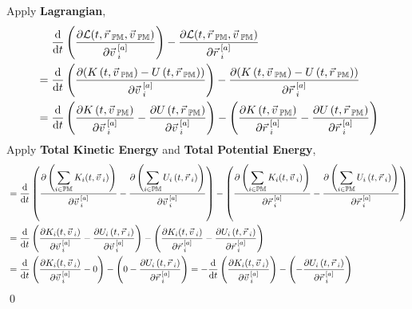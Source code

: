 \documentclass[12pt]{amsart}
\renewenvironment{proof}{{\bfseries Proof.}}{\qed}
\let\oldvec\vec
\renewcommand{\vec}[1]{\oldvec{#1}\hspace{0.1em}}
\begin{document}
\begin{proof}
Apply \textbf{Lagrangian},
\begin{align*}
& \quad \ \dfrac{\mathrm{d}}{\mathrm{d} t} \left ( \dfrac{\partial \mathcal{L} (t, \vec{r}_\mathbb{PM}, \vec{v}_\mathbb{PM})}{\partial \vec{v}^{[a]}_i}  \right ) - \dfrac{\partial \mathcal{L} (t, \vec{r}_\mathbb{PM}, \vec{v}_\mathbb{PM})}{\partial \vec{r}^{[a]}_i}\\
&= \dfrac{\mathrm{d}}{\mathrm{d} t} \left ( \dfrac{\partial (K\left ( t, \vec{v}_\mathbb{PM} \right ) - U\left ( t, \vec{r}_\mathbb{PM} \right ))}{\partial \vec{v}^{[a]}_i}  \right ) - \dfrac{\partial (K\left ( t, \vec{v}_\mathbb{PM} \right )-U\left ( t, \vec{r}_\mathbb{PM} \right ))}{\partial \vec{r}^{[a]}_i} \\
& = \dfrac{\mathrm{d}}{\mathrm{d} t} \left ( \dfrac{\partial K \left ( t, \vec{v}_\mathbb{PM} \right )}{\partial \vec{v}^{[a]}_i} - \dfrac{\partial U\left ( t, \vec{r}_\mathbb{PM} \right )}{\partial \vec{v}^{[a]}_i}  \right ) - \left ( \dfrac{\partial K\left ( t, \vec{v}_\mathbb{PM} \right )}{\partial \vec{r}^{[a]}_i} - \dfrac{\partial U\left ( t, \vec{r}_\mathbb{PM} \right )}{\partial \vec{r}^{[a]}_i} \right )
\end{align*}
Apply \textbf{Total Kinetic Energy} and \textbf{Total Potential Energy},
\begin{align*}
& = \dfrac{\mathrm{d}}{\mathrm{d} t} \left ( \dfrac{\partial \left (\displaystyle \sum_{i \in \mathbb{PM}} K_i (t, \vec{v}_i) \right )}{\partial \vec{v}^{[a]}_i} - \dfrac{\partial \left ( \displaystyle \sum_{i \in \mathbb{PM}} U_i \left ( t, \vec{r}_i \right )\right )}{\partial \vec{v}^{[a]}_i}  \right ) - \left ( \dfrac{\partial \left ( \displaystyle \sum_{i \in \mathbb{PM}} K_i (t, \vec{v}_i) \right )}{\partial \vec{r}^{[a]}_i} - \dfrac{\partial \left ( \displaystyle \sum_{i \in \mathbb{PM}} U_i \left ( t, \vec{r}_i \right ) \right )}{\partial \vec{r}^{[a]}_i} \right )\\
& = \dfrac{\mathrm{d}}{\mathrm{d} t} \left ( \dfrac{\partial K_i (t, \vec{v}_i) }{\partial \vec{v}^{[a]}_i} - \dfrac{\partial U_i \left ( t, \vec{r}_i \right )}{\partial \vec{v}^{[a]}_i}  \right ) - \left ( \dfrac{\partial K_i (t, \vec{v}_i)}{\partial \vec{r}^{[a]}_i} - \dfrac{\partial  U_i \left ( t, \vec{r}_i \right )}{\partial \vec{r}^{[a]}_i} \right )\\
& = \dfrac{\mathrm{d}}{\mathrm{d} t} \left ( \dfrac{\partial K_i (t, \vec{v}_i)}{\partial \vec{v}^{[a]}_i} - 0 \right ) - \left ( 0 - \dfrac{\partial  U_i \left ( t, \vec{r}_i \right )}{\partial \vec{r}^{[a]}_i} \right ) = - \dfrac{\mathrm{d}}{\mathrm{d} t} \left ( \dfrac{\partial K_i (t, \vec{v}_i)}{\partial \vec{v}^{[a]}_i} \right ) - \left ( - \dfrac{\partial  U_i \left ( t, \vec{r}_i \right )}{\partial \vec{r}^{[a]}_i} \right ) \\

\end{align*}
\end{proof}
\end{document}
